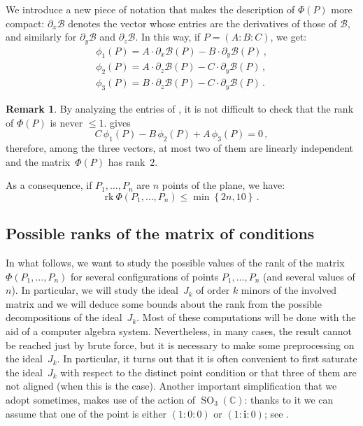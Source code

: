 \documentclass{amsart}
\theoremstyle{plain}
\theoremstyle{definition}
\newtheorem{rmk}[lemma]{Remark}
\newcommand{\C}{\mathbb{C}}
\newcommand{\de}{\partial}
\newcommand{\SO}{\operatorname{SO}}
\newcommand{\iii}{\textbf{i}}
\newcommand{\rk}{\ensuremath{\mathrm{rk}}}
\begin{document}
We introduce a new piece of notation that makes the description of $\Phi(P)$ more compact: $\de_x \mathcal{B}$ denotes the vector whose entries are the derivatives of those of $\mathcal{B}$, and similarly for $\de_y \mathcal{B}$ and $\de_z \mathcal{B}$.
In this way, if $P=(A: B: C)$, we get:
%
\begin{equation}
\label{equation:vector_conditions}
\begin{gathered}
\phi_1(P) = A\cdot \de_x \mathcal{B}(P) - B\cdot \de_y \mathcal{B}(P) \,, \\
\phi_2(P) = A\cdot \de_z \mathcal{B}(P) - C\cdot \de_y \mathcal{B}(P) \,, \\
\phi_3(P) = B\cdot \de_z \mathcal{B}(P) - C\cdot \de_y \mathcal{B}(P) \,.
\end{gathered}
\end{equation}
%
\begin{rmk}
By analyzing the entries of , it is not difficult to check that the rank of $\Phi(P)$ is never $\leq 1$.  gives
\begin{equation}
  C \, \phi_1(P) - B \, \phi_2(P) + A \, \phi_3(P) = 0 \,,
  \label{eq:base}
\end{equation}
therefore,
among the three vectors, at most two of them are linearly independent and the matrix~$\Phi(P)$ has rank~$2$.
\end{rmk}

As a consequence, if $P_1, \dots, P_n$ are $n$ points of the plane, we have:
\begin{equation}
\label{bound_rank}
\rk \ \Phi(P_1, \dots, P_n) \leq \min \left\{2n, 10 \right\} \,.
\end{equation}

\subsection{Possible ranks of the matrix of conditions}

In what follows, we want to study the possible values of the rank of the matrix
$\Phi(P_1, \dots, P_n)$ for several configurations of points $P_1, \dots, P_n$
(and several values of $n$).
In particular, we will study the ideal~$J_k$ of order $k$ minors of the
involved matrix and we will deduce some bounds about the rank from the possible
decompositions of the ideal~$J_k$. Most of these computations will be done
with the aid of a computer algebra system. Nevertheless, in many cases,
the result cannot be reached just by brute force, but it is necessary to
make some preprocessing on the ideal~$J_k$. In particular, it turns out that
it is often convenient to first saturate the ideal~$J_k$ with respect to
the distinct point condition or that three of them are not aligned (when this is the
case). Another important simplification that we adopt sometimes, makes use
of the action of $\SO_3(\C)$: thanks to it we can assume that one of
the point is either $(1: 0: 0)$ or $(1: \iii: 0)$; see .
\end{document}
